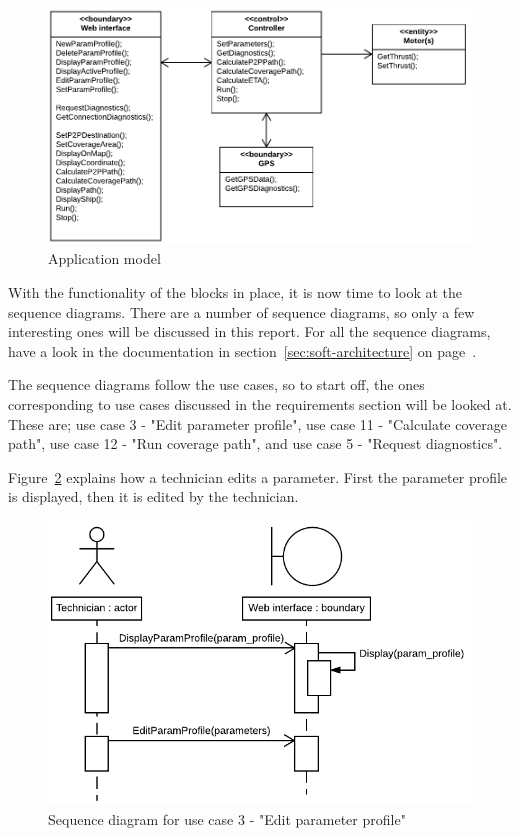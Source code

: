 \begin{figure}[H]
\centering
\includegraphics[width=1\linewidth]{../Appendix/Project/Dokumentation/Images/System_architecture/Application_Model}
\caption{Application model}
\label{fig:applicationmodel}
\end{figure}

With the functionality of the blocks in place, it is now time to look at the sequence diagrams. There are a number of sequence diagrams, so only a few interesting ones will be discussed in this report. For all the sequence diagrams, have a look in the documentation in section~\ref{sec:soft-architecture} on page~\pageref{sec:soft-architecture}.

The sequence diagrams follow the use cases, so to start off, the ones corresponding to use cases discussed in the requirements section will be looked at. These are; use case 3 - "Edit parameter profile", use case 11 - "Calculate coverage path", use case 12 - "Run coverage path", and use case 5 - "Request diagnostics". 

Figure~\ref{fig:usecase3sd} explains how a technician edits a parameter. First the parameter profile is displayed, then it is edited by the technician.  

\begin{figure}[H]
\centering
\includegraphics[width=1\linewidth]{../Appendix/Project/Dokumentation/Images/System_architecture/Use_case_3_SD}
\caption{Sequence diagram for use case 3 - "Edit parameter profile"}
\label{fig:usecase3sd}
\end{figure}

